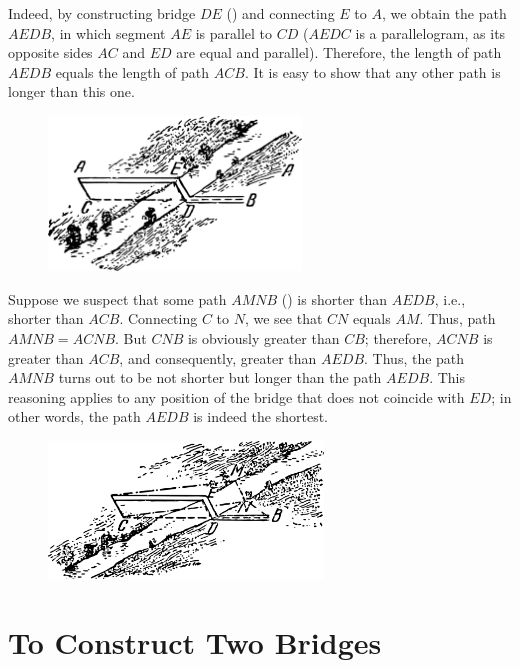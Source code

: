 Indeed, by constructing bridge $DE$ () and connecting $E$ to $A$, we obtain the path $AEDB$, in which segment $AE$ is parallel to $CD$ ($AEDC$ is a parallelogram, as its opposite sides $AC$ and $ED$ are equal and parallel). Therefore, the length of path $AEDB$ equals the length of path $ACB$. It is easy to show that any other path is longer than this one. 

\begin{figure}[h!]
\centering
\includegraphics[width=0.6\textwidth]{figures/ch-02/fig-058.pdf}
\end{figure}


Suppose we suspect that some path $AMNB$ () is shorter than $AEDB$, i.e., shorter than $ACB$. Connecting $C$ to $N$, we see that $CN$ equals $AM$. Thus, path $AMNB = ACNB$. But $CNB$ is obviously greater than $CB$; therefore, $ACNB$ is greater than $ACB$, and consequently, greater than $AEDB$. Thus, the path $AMNB$ turns out to be not shorter but longer than the path $AEDB$. This reasoning applies to any position of the bridge that does not coincide with $ED$; in other words, the path $AEDB$ is indeed the shortest.

\begin{figure}[h!]
\centering
\includegraphics[width=0.65\textwidth]{figures/ch-02/fig-059.pdf}
\end{figure}


\section{To Construct Two Bridges}
\label{sec-2.18}

